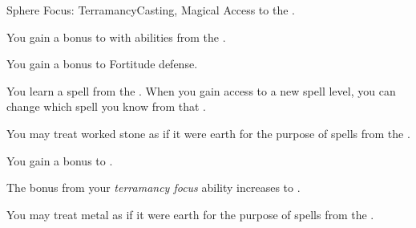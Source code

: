     \begin{feat}{Sphere Focus: Terramancy}{Casting, Magical}
        \featpre Access to the  .

         You gain a  bonus to  with abilities from the  .

         You gain a  bonus to Fortitude defense.

         You learn a spell from the  .
        When you gain access to a new spell level, you can change which spell you know from that .

         You may treat worked stone as if it were earth for the purpose of spells from the  .

         You gain a  bonus to .

         The bonus from your \textit{terramancy focus} ability increases to .

         You may treat metal as if it were earth for the purpose of spells from the  .
    \end{feat}


